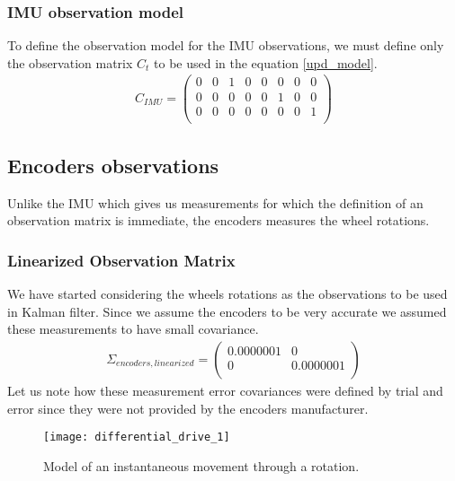 \subsubsection{IMU observation model}
To define the observation model for the IMU observations, we must define only the observation matrix $C_t$ to be used in the equation \ref{upd_model}.
\begin{align}
	C_{IMU} = \begin{pmatrix}
				0 & 0 & 1 & 0 & 0 & 0 & 0 & 0\\
				0 & 0 & 0 & 0 & 0 & 1 & 0 & 0\\
				0 & 0 & 0 & 0 & 0 & 0 & 0 & 1\\
			\end{pmatrix}
\end{align}



\subsection{Encoders observations}
Unlike the IMU which gives us measurements for which the definition of an observation matrix is immediate, the encoders measures the wheel rotations.\\

\subsubsection{Linearized Observation Matrix}
We have started considering the wheels rotations as the observations to be used in Kalman filter. Since we assume the encoders to be very accurate we assumed these measurements to have small covariance.
\begin{align}
	\Sigma_{encoders,linearized} = \begin{pmatrix}
				0.0000001 & 0\\
				0 & 0.0000001\\
			\end{pmatrix}
\end{align}
Let us note how these measurement error covariances were defined by trial and error since they were not provided by the encoders manufacturer.

\begin{figure}[!ht]
	\texttt{[image: differential\_drive\_1]}
	\captionsetup{justification=centering, margin=1.5cm}
	\centering
	\caption{Model of an instantaneous movement through a rotation.}
	\centering
\end{figure}

